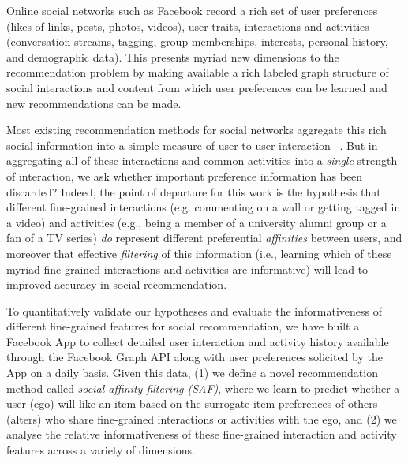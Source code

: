 
\label{sec:introduction}

Online social networks such as Facebook record a rich set of user
preferences (likes of links, posts, photos, videos), user traits,
interactions and activities (conversation streams, tagging, group
memberships, interests, personal history, and demographic data).  This
presents myriad new dimensions to the recommendation problem by making
available a rich labeled graph structure of social interactions and
content from which user preferences can be learned and new
recommendations can be made.

Most existing recommendation methods for social networks aggregate
this rich social information into a simple measure of user-to-user
interaction ~\cite{socinf,rrmf,sr,Noel2012NOF,lla,ste,sorec}.  But in
aggregating all of these interactions and common activities into a
\emph{single} strength of interaction, we
ask whether important preference information has been discarded?
Indeed, the point of departure for this work is the hypothesis that
different fine-grained interactions (e.g. commenting on a wall or
getting tagged in a video) and activities (e.g., being a member of a
university alumni group or a fan of a TV series) \emph{do} represent
different preferential {\em affinities} between users, and moreover
that effective {\em filtering} of this information (i.e., learning
which of these myriad fine-grained interactions and activities are 
informative) will lead to improved accuracy in social recommendation.

To quantitatively validate our hypotheses and evaluate the
informativeness of different fine-grained features for social
recommendation, we have built a Facebook App to collect detailed user
interaction and activity history available through the Facebook Graph
API along with user preferences solicited by the App on a daily basis.
Given this data, (1) we define a novel recommendation method called
{\em social affinity filtering (SAF)}, where we learn to predict
whether a user (ego) will like an item based on the surrogate item
preferences of others (alters) who share fine-grained interactions or
activities with the ego, and (2) we analyse the relative
informativeness of these fine-grained interaction and activity
features across a variety of dimensions.

